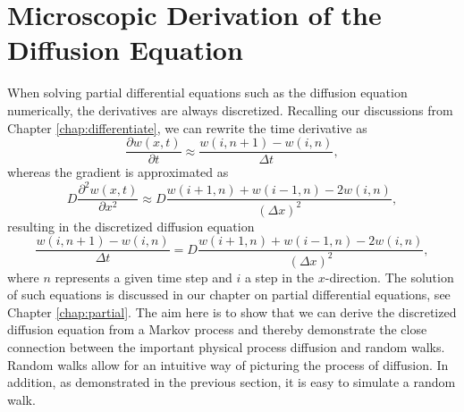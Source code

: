 \section{Microscopic Derivation of the Diffusion Equation}\label{sec:profrandomdiff}

When solving partial differential equations such as the diffusion equation numerically,
the derivatives are always discretized. Recalling our discussions from Chapter 
\ref{chap:differentiate}, we can rewrite the time derivative as
\[
    \frac{\partial w(x,t)}{\partial t} \approx 
    \frac{w(i,n+1)-w(i,n)}{\Delta t},
\]
whereas the gradient is approximated as
\[
    D\frac{\partial^2w(x,t)}{\partial x^2}\approx 
    D\frac{w(i+1,n)+w(i-1,n)-2w(i,n)}{(\Delta x)^2},
\]
resulting in the discretized diffusion equation
\[
   \frac{w(i,n+1)-w(i,n)}{\Delta t}=D\frac{w(i+1,n)+w(i-1,n)-2w(i,n)}{(\Delta x)^2},
\]
where $n$ represents a given time step and $i$ a step in the $x$-direction.
The solution of such equations is discussed in our chapter on partial differential
equations, see Chapter \ref{chap:partial}.
The aim here is to show that we can derive the discretized diffusion equation from a Markov process
and thereby demonstrate the close connection between the important physical process 
diffusion and random walks. Random walks allow for an intuitive way of picturing the process
of diffusion. In addition, as demonstrated in the previous section, it is easy to simulate a 
random walk.

